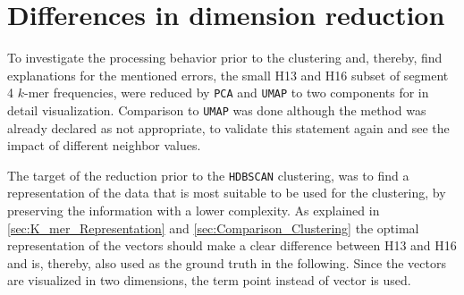 \section{Differences in dimension reduction} \label{sec:Dimension_Reduction}

To investigate the processing behavior prior to the clustering and, thereby, find explanations for the mentioned errors, the small H13 and H16 subset of segment 4 $k$-mer frequencies, were reduced by \texttt{PCA} and \texttt{UMAP} to two components for in detail visualization. Comparison to \texttt{UMAP} was done although the method was already declared as not appropriate, to validate this statement again and see the impact of different neighbor values. 

\vspace{1em}

The target of the reduction prior to the \texttt{HDBSCAN} clustering, was to find a representation of the data that is most suitable to be used for the clustering, by preserving the information with a lower complexity. As explained in \autoref{sec:K_mer_Representation} and \autoref{sec:Comparison_Clustering} the optimal representation of the vectors should make a clear difference between H13 and H16 and is, thereby, also used as the ground truth in the following. Since the vectors are visualized in two dimensions, the term point instead of vector is used.

